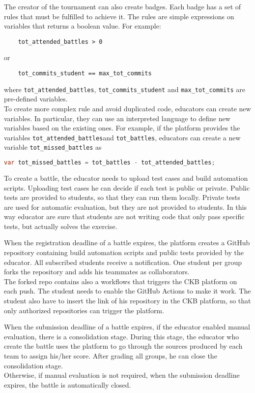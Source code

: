 The creator of the tournament can also create badges.
Each badge has a set of rules that must be fulfilled to achieve it.
The rules are simple expressions on variables that returns a boolean value.
For example:
\begin{lstlisting}
    tot_attended_battles > 0
\end{lstlisting}
or
\begin{lstlisting}
    tot_commits_student == max_tot_commits
\end{lstlisting}
where \lstinline{tot_attended_battles}, \lstinline{tot_commits_student} and \lstinline{max_tot_commits} are pre-defined variables.\\
To create more complex rule and avoid duplicated code, educators can create new variables.
In particular, they can use an interpreted language to define new variables based on the existing ones.
For example, if the platform provides the variables \lstinline{tot_attended_battles}and \lstinline{tot_battles},
educators can create a new variable \lstinline{tot_missed_battles} as
\begin{lstlisting}[language=java, morekeywords={var}, keywordstyle=\color{blue}]
    var tot_missed_battles = tot_battles - tot_attended_battles;
\end{lstlisting}

To create a battle, the educator needs to upload test cases and build automation scripts.
Uploading test cases he can decide if each test is public or private.
Public tests are provided to students, so that they can run them locally.
Private tests are used for automatic evaluation, but they are not provided to students.
In this way educator are sure that students are not writing code that only pass specific tests, but actually solves the exercise.

When the registration deadline of a battle expires, the platform creates a GitHub repository containing build automation scripts and public tests provided by the educator.
All subscribed students receive a notification.
One student per group forks the repository and adds his teammates as collaborators.\\
The forked repo contains also a workflows that triggers the CKB platform on each push.
The student needs to enable the GitHub Actions to make it work.
The student also have to insert the link of his repository in the CKB platform, so that only authorized repositories can trigger the platform.

When the submission deadline of a battle expires, if the educator enabled manual evaluation, there is a consolidation stage.
During this stage, the educator who create the battle uses the platform to go through the sources produced by each team to assign his/her score.
After grading all groups, he can close the consolidation stage.\\
Otherwise, if manual evaluation is not required, when the submission deadline expires, the battle is automatically closed.

